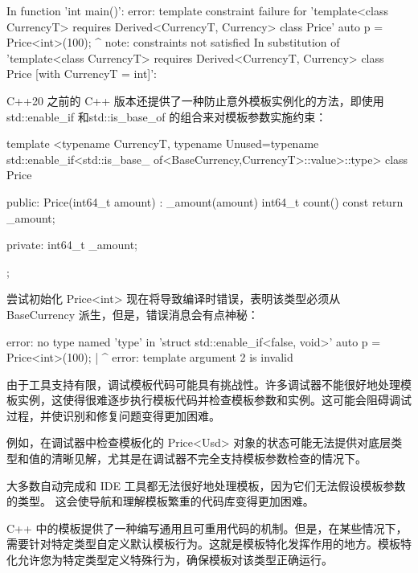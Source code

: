 \begin{shell}
In function 'int main()':
error: template constraint failure for 'template<class
CurrencyT> requires Derived<CurrencyT, Currency> class Price'
auto p = Price<int>(100);
                  ^
note: constraints not satisfied
In substitution of 'template<class
CurrencyT> requires Derived<CurrencyT, Currency> class Price [with
CurrencyT = int]':
\end{shell}

C++20 之前的 C++ 版本还提供了一种防止意外模板实例化的方法，即使用 std::enable\_if 和std::is\_base\_of 的组合来对模板参数实施约束：

\begin{cpp}
template <typename CurrencyT,
          typename Unused=typename std::enable_if<std::is_base_
of<BaseCurrency,CurrencyT>::value>::type>
class Price {
public:
    Price(int64_t amount) : _amount(amount) {}
    int64_t count() const { return _amount; }

private:
    int64_t _amount;
};
\end{cpp}

尝试初始化 Price<int> 现在将导致编译时错误，表明该类型必须从 BaseCurrency 派生，但是，错误消息会有点神秘：

\begin{shell}
error: no type named 'type' in 'struct std::enable_if<false, void>'
auto p = Price<int>(100);
     |              ^
error: template argument 2 is invalid
\end{shell}



由于工具支持有限，调试模板代码可能具有挑战性。许多调试器不能很好地处理模板实例，这使得很难逐步执行模板代码并检查模板参数和实例。这可能会阻碍调试过程，并使识别和修复问题变得更加困难。

例如，在调试器中检查模板化的 Price<Usd> 对象的状态可能无法提供对底层类型和值的清晰见解，尤其是在调试器不完全支持模板参数检查的情况下。

大多数自动完成和 IDE 工具都无法很好地处理模板，因为它们无法假设模板参数的类型。
这会使导航和理解模板繁重的代码库变得更加困难。


C++ 中的模板提供了一种编写通用且可重用代码的机制。但是，在某些情况下，需要针对特定类型自定义默认模板行为。这就是模板特化发挥作用的地方。模板特化允许您为特定类型定义特殊行为，确保模板对该类型正确运行。


